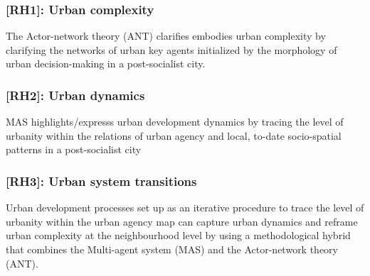 \documentclass[11pt]{report}
\begin{document}
\subsubsection{[RH1]: Urban complexity}

The Actor-network theory (ANT) clarifies embodies urban complexity by clarifying the networks of urban key agents initialized by the morphology of urban decision-making in a post-socialist city.

\subsubsection{[RH2]: Urban dynamics}

MAS highlights/expresss urban development dynamics by tracing the level of urbanity within the relations of urban agency and local, to-date socio-spatial patterns in a post-socialist city

\subsubsection{[RH3]: Urban system transitions}

Urban development processes set up as an iterative procedure to trace the level of urbanity within the urban agency map can capture urban dynamics and reframe urban complexity at the neighbourhood level by using a methodological hybrid that combines the Multi-agent system (MAS) and the Actor-network theory (ANT).
\end{document}
